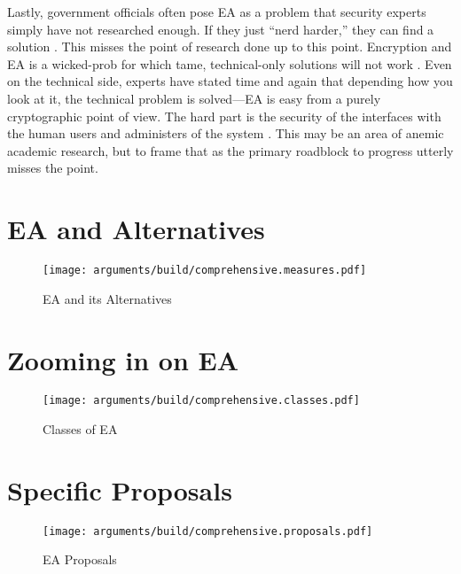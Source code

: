 Lastly, government officials often pose \ac{EA} as a problem that security experts simply have not researched enough. If
they just ``nerd harder,'' they can find a solution \cite{schneier_2019}. This misses the point of research done up to
this point. Encryption and \ac{EA} is a \ac{wicked-prob} for which tame, technical-only solutions will not work
\cite{rozenshtein_wicked_2018}. Even on the technical side, experts have stated time and again that depending how you
look at it, the technical problem is solved---\ac{EA} is easy from a purely cryptographic point of view. The hard part
is the security of the interfaces with the human users and administers of the system \cite{abelson_risks_1997}
\cite{abelson_2015}. This may be an area of anemic academic research, but to frame that as the primary roadblock to
progress utterly misses the point.


\section{EA and Alternatives}

\begin{figure}[h]
  \centering\CaptionFontSize
  \texttt{[image: arguments/build/comprehensive.measures.pdf]}
  \caption{EA and its Alternatives}
  \label{fig-arg-measures}
\end{figure}


\section{Zooming in on EA}

\begin{figure}[h]
  \centering\CaptionFontSize
  \texttt{[image: arguments/build/comprehensive.classes.pdf]}
  \caption{Classes of EA}
  \label{fig-arg-classes}
\end{figure}



\section{Specific Proposals}

\begin{figure}[h]
  \centering\CaptionFontSize
  \texttt{[image: arguments/build/comprehensive.proposals.pdf]}
  \caption{EA Proposals}
  \label{fig-arg-proposals}
\end{figure}

